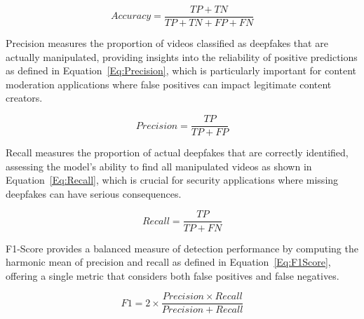 \documentclass[conference]{IEEEtran}
\begin{document}
\begin{equation}
    Accuracy = \frac{TP + TN}{TP + TN + FP + FN}
    \label{Eq:Accuracy}
\end{equation}

Precision measures the proportion of videos classified as deepfakes that are actually manipulated, providing insights into the reliability of positive predictions as defined in Equation~\ref{Eq:Precision}, which is particularly important for content moderation applications where false positives can impact legitimate content creators.

\begin{equation}
    Precision = \frac{TP}{TP + FP}
    \label{Eq:Precision}
\end{equation}

Recall measures the proportion of actual deepfakes that are correctly identified, assessing the model's ability to find all manipulated videos as shown in Equation~\ref{Eq:Recall}, which is crucial for security applications where missing deepfakes can have serious consequences.

\begin{equation}
    Recall = \frac{TP}{TP + FN}
    \label{Eq:Recall}
\end{equation}

F1-Score provides a balanced measure of detection performance by computing the harmonic mean of precision and recall as defined in Equation~\ref{Eq:F1Score}, offering a single metric that considers both false positives and false negatives.

\begin{equation}
    F1 = 2 \times \frac{Precision \times Recall}{Precision + Recall}
    \label{Eq:F1Score}
\end{equation}
\end{document}
